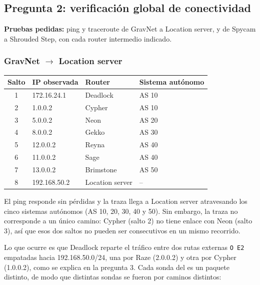 \subsection{Pregunta 2: verificación global de conectividad}

\textbf{Pruebas pedidas:} ping y traceroute de GravNet a Location server, y de Spycam a Shrouded Step, con cada router intermedio indicado.

\subsubsection*{GravNet $\rightarrow$ Location server}

\begin{center}\small
\begin{tabular}{@{}clll@{}}
  \toprule
  Salto & IP observada & Router & Sistema autónomo \\
  \midrule
  1 & 172.16.24.1 & Deadlock & AS 10 \\
  2 & 1.0.0.2 & Cypher & AS 10 \\
  3 & 5.0.0.2 & Neon & AS 20 \\
  4 & 8.0.0.2 & Gekko & AS 30 \\
  5 & 12.0.0.2 & Reyna & AS 40 \\
  6 & 11.0.0.2 & Sage & AS 40 \\
  7 & 13.0.0.2 & Brimstone & AS 50 \\
  8 & 192.168.50.2 & Location server & -- \\
  \bottomrule
\end{tabular}
\end{center}

El ping responde sin pérdidas y la traza llega a Location server atravesando los cinco sistemas autónomos (AS 10, 20, 30, 40 y 50). Sin embargo, la traza no corresponde a un único camino: Cypher (salto 2) no tiene enlace con Neon (salto 3), así que esos dos saltos no pueden ser consecutivos en un mismo recorrido.

Lo que ocurre es que Deadlock reparte el tráfico entre dos rutas externas \texttt{O E2} empatadas hacia 192.168.50.0/24, una por Raze (2.0.0.2) y otra por Cypher (1.0.0.2), como se explica en la pregunta 3. Cada sonda del  es un paquete distinto, de modo que distintas sondas se fueron por caminos distintos:

